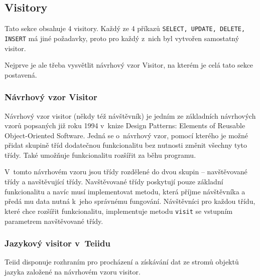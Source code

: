 \documentclass[oneside,12pt]{fithesis2}
\begin{document}
\subsection{Visitory}
\label{visitory}
Tato sekce obsahuje 4 visitory. Každý ze 4 příkazů \texttt{SELECT, UPDATE, DELETE, INSERT} má jiné požadavky, proto pro každý z~nich byl vytvořen samostatný visitor.

Nejprve je ale třeba vysvětlit návrhový vzor Visitor, na kterém je celá tato sekce postavená.
\subsubsection*{Návrhový vzor Visitor}

Návrhový vzor visitor (někdy též návštěvník) je jedním ze základních návrhových vzorů popsaných již roku 1994 v~knize Design Patterns: Elements of Reusable Object-Oriented Software. Jedná se o~návrhový vzor, pomocí kterého je možné přidat skupině tříd dodatečnou funkcionalitu bez nutnosti změnit všechny tyto třídy. Také umožňuje funkcionalitu rozšířit za běhu programu.

V~tomto návrhovém vzoru jsou třídy rozdělené do dvou skupin -- navštěvované třídy a navštěvující třídy. Navštěvované třídy poskytují pouze základní funkcionalitu a navíc musí implementovat metodu, která příjme návštěvníka a předá mu data nutná k~jeho správnému fungování. Návštěvníci pro každou třídu, které chce rozšířit funkcionalitu, implementuje metodu \texttt{visit} se vstupním parametrem navštěvované třídy.


\subsubsection*{Jazykový visitor v~Teiidu}
Teiid disponuje rozhraním pro procházení a získávání dat ze stromů objektů jazyka založené na návrhovém vzoru visitor.
\end{document}
